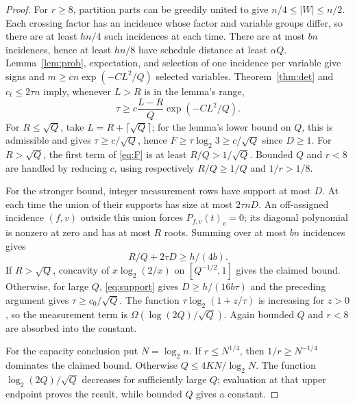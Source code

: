 \documentclass[11pt]{article}
\begin{document}
\begin{proof}
For $r\ge8$, partition parts can be greedily united to give $n/4\le|W|\le n/2$. Each crossing factor has an incidence whose factor and variable groups differ, so there are at least $hn/4$ such incidences at each time. There are at most $bn$ incidences, hence at least $hn/8$ have schedule distance at least $\alpha Q$. Lemma~\ref{lem:prob}, expectation, and selection of one incidence per variable give signs and $m\ge cn\exp(-CL^2/Q)$ selected variables. Theorem~\ref{thm:det} and $c_t\le2\tau n$ imply, whenever $L>R$ is in the lemma's range,
\begin{equation}\label{eq:threshold}
 \tau\ge c\frac{L-R}{Q}\exp(-CL^2/Q).
\end{equation}
For $R\le\sqrt Q$, take $L=R+\lceil\sqrt Q\rceil$; for the lemma's lower bound on $Q$, this is admissible and gives $\tau\ge c/\sqrt Q$, hence $F\ge\tau\log_2 3\ge c/\sqrt Q$ since $D\ge1$. For $R>\sqrt Q$, the first term of \eqref{eq:F} is at least $R/Q>1/\sqrt Q$. Bounded $Q$ and $r<8$ are handled by reducing $c$, using respectively $R/Q\ge1/Q$ and $1/r>1/8$.

For the stronger bound, integer measurement rows have support at most $D$. At each time the union of their supports has size at most $2\tau nD$. An off-assigned incidence $(f,v)$ outside this union forces $P_{f,v}(t)_v=0$; its diagonal polynomial is nonzero at zero and has at most $R$ roots. Summing over at most $bn$ incidences gives
\begin{equation}\label{eq:support}
 R/Q+2\tau D\ge h/(4b).
\end{equation}
If $R>\sqrt Q$, concavity of $x\log_2(2/x)$ on $[Q^{-1/2},1]$ gives the claimed bound. Otherwise, for large $Q$, \eqref{eq:support} gives $D\ge h/(16b\tau)$ and the preceding argument gives $\tau\ge c_0/\sqrt Q$. The function $\tau\log_2(1+z/\tau)$ is increasing for $z>0$, so the measurement term is $\Omega(\log(2Q)/\sqrt Q)$. Again bounded $Q$ and $r<8$ are absorbed into the constant.

For the capacity conclusion put $N=\log_2 n$. If $r\le N^{1/4}$, then $1/r\ge N^{-1/4}$ dominates the claimed bound. Otherwise $Q\le4KN/\log_2 N$. The function $\log_2(2Q)/\sqrt Q$ decreases for sufficiently large $Q$; evaluation at that upper endpoint proves the result, while bounded $Q$ gives a constant.
\end{proof}
\end{document}

